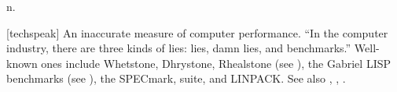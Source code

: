  n.

[techspeak] An inaccurate measure of computer performance. ``In the computer
industry, there are three kinds of lies: lies, damn lies, and benchmarks.''
Well-known ones include Whetstone, Dhrystone, Rhealstone (see ),
the Gabriel LISP benchmarks (see ), the SPECmark, suite, and
LINPACK. See also , , .

